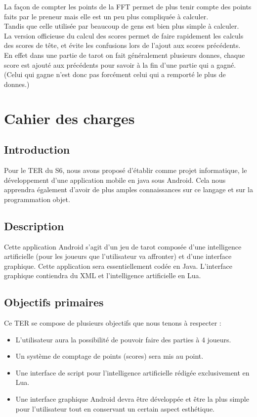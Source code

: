 \documentclass[a4paper]{report}
\begin{document}
				La façon de compter les points de la FFT permet de plus tenir compte des points faits par le preneur mais elle est un peu plus compliquée à calculer.\\
				Tandis que celle utilisée par beaucoup de gens est bien plus simple à calculer.\\
				La version officieuse du calcul des scores permet de faire rapidement les calculs des scores de tête, et évite les confusions lors de l’ajout aux scores précédents.\\
				En effet dans une partie de tarot on fait généralement plusieurs donnes, chaque score est ajouté aux précédents pour savoir à la fin d’une partie qui a gagné. (Celui 					qui gagne n’est donc pas forcément celui qui a remporté le plus de donnes.)\\













\chapter{Cahier des charges}
	\section{Introduction}

		Pour le TER du S6, nous avons proposé d'établir comme projet informatique, le développement d'une application mobile en java sous Android. Cela nous apprendra également d'avoir de plus 			amples 	connaissances sur ce langage et sur la programmation objet.
	\section{Description}

		Cette application Android s'agit d'un jeu de tarot composée d'une intelligence artificielle (pour les joueurs que l'utilisateur va affronter) et d'une interface graphique. Cette 			application sera essentiellement codée en Java. L'interface graphique contiendra du XML et l'intelligence artificielle en Lua.
	\section{Objectifs primaires}

		Ce TER se compose de plusieurs objectifs que nous tenons à respecter :
		\begin{itemize}
			\item L'utilisateur aura la possibilité de pouvoir faire des parties à 4 joueurs.
			\item Un système de comptage de points (scores) sera mis au point.
			\item Une interface de script pour l'intelligence artificielle rédigée exclusivement en Lua.
			\item Une interface graphique Android devra être développée et être la plus simple pour l'utilisateur tout en conservant un certain aspect esthétique.
		\end{itemize}
\end{document}

